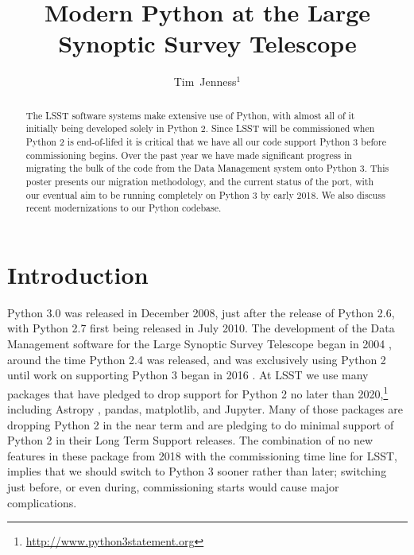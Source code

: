 \documentclass[11pt,twoside]{article}
\begin{document}
\title{Modern Python at the Large Synoptic Survey Telescope}

\author{Tim~Jenness$^1$
}


\begin{abstract}
  The LSST software systems make extensive use of Python, with almost all of it initially being developed solely in Python 2.
  Since LSST will be commissioned when Python 2 is end-of-lifed it is critical that we have all our code support Python 3 before commissioning begins.
  Over the past year we have made significant progress in migrating the bulk of the code from the Data Management system onto Python 3.
  This poster presents our migration methodology, and the current status of the port, with our eventual aim to be running completely on Python 3 by early 2018.
  We also discuss recent modernizations to our Python codebase.
\end{abstract}

\section{Introduction}

Python 3.0 was released in December 2008, just after the release of Python 2.6, with Python 2.7 first being released in July 2010.
The development of the Data Management software for the Large Synoptic Survey Telescope \citep[LSST;][]{2008arXiv0805.2366I} began in 2004 \citep{2004AAS...20510811A}, around the time Python 2.4 was released, and was exclusively using Python 2 until work on supporting Python 3 began in 2016 \citep{P6-12_adassxxvi}.
At LSST we use many packages that have pledged to drop support for Python 2 no later than 2020,\footnote{\url{http://www.python3statement.org}} including Astropy \citep{2013A&A...558A..33A}, pandas, matplotlib, and Jupyter.
Many of those packages are dropping Python 2 in the near term and are pledging to do minimal support of Python 2 in their Long Term Support releases.
The combination of no new features in these package from 2018 with the commissioning time line for LSST, implies that we should switch to Python 3 sooner rather than later; switching just before, or even during, commissioning starts would cause major complications.
\end{document}
